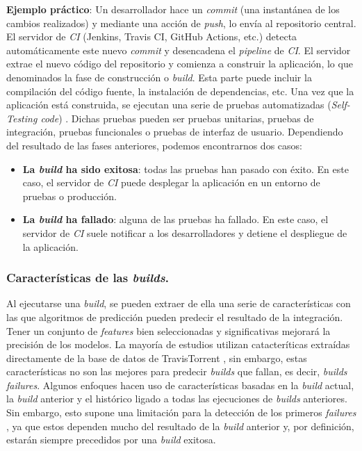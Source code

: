 \textbf{Ejemplo práctico}: Un desarrollador hace un \textit{commit} (una
instantánea de los cambios realizados) y mediante una acción de \textit{push}, lo envía al
repositorio central. El servidor de \textit{CI} \cite{10} (Jenkins, Travis CI, GitHub Actions,
etc.) detecta automáticamente este nuevo \textit{commit} y desencadena el \textit{pipeline} de
\textit{CI}. El servidor extrae el nuevo código del repositorio y comienza a construir la
aplicación, lo que denominados la fase de construcción o \textit{build}. Esta parte puede incluir
la compilación del código fuente, la instalación de dependencias, etc. Una vez que la aplicación
está construida, se ejecutan una serie de pruebas automatizadas (\textit{Self-Testing code})
\cite{11}. Dichas pruebas pueden ser pruebas unitarias, pruebas de integración, pruebas
funcionales o pruebas de interfaz de usuario. Dependiendo del resultado de las fases anteriores,
podemos encontrarnos dos casos:

\begin{itemize}
    \item \textbf{La \textit{build} ha sido exitosa}: todas las pruebas han pasado con éxito. En
          este caso, el servidor de \textit{CI} puede desplegar la aplicación en un entorno de
          pruebas o producción.
    \item \textbf{La \textit{build} ha fallado}: alguna de las pruebas ha fallado. En este caso,
          el servidor de \textit{CI} suele notificar a los desarrolladores y detiene el
          despliegue de la aplicación.
\end{itemize}


\subsubsection{Características de las \textit{builds}.}
Al ejecutarse una \textit{build}, se pueden extraer de ella una serie de características con las
que algoritmos de predicción pueden predecir el resultado de la integración. Tener un conjunto
de \textit{features} bien seleccionadas y significativas mejorará la precisión de los modelos.
La mayoría de estudios utilizan catacteríticas extraídas directamente de la base de datos de
TravisTorrent \cite{7}, sin embargo, estas características no son las mejores para predecir
\textit{builds} que fallan, es decir, \textit{builds failures}. Algunos enfoques \cite{7,8}
hacen uso de características basadas en la \textit{build} actual, la \textit{build} anterior y
el histórico ligado a todas las ejecuciones de \textit{builds} anteriores. Sin embargo, esto
supone una limitación para la detección de los primeros \textit{failures} \cite{2}, ya que estos
dependen mucho del resultado de la \textit{build} anterior y, por definición, estarán siempre
precedidos por una \textit{build} exitosa.\\

